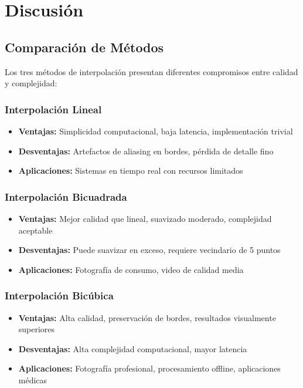 \section{Discusión}\label{sec:discusion}

\subsection{Comparación de Métodos}

Los tres métodos de interpolación presentan diferentes compromisos entre calidad y complejidad:

\subsubsection{Interpolación Lineal}
\begin{itemize}
    \item \textbf{Ventajas:} Simplicidad computacional, baja latencia, implementación trivial
    \item \textbf{Desventajas:} Artefactos de aliasing en bordes, pérdida de detalle fino
    \item \textbf{Aplicaciones:} Sistemas en tiempo real con recursos limitados
\end{itemize}

\subsubsection{Interpolación Bicuadrada}
\begin{itemize}
    \item \textbf{Ventajas:} Mejor calidad que lineal, suavizado moderado, complejidad aceptable
    \item \textbf{Desventajas:} Puede suavizar en exceso, requiere vecindario de 5 puntos
    \item \textbf{Aplicaciones:} Fotografía de consumo, video de calidad media
\end{itemize}

\subsubsection{Interpolación Bicúbica}
\begin{itemize}
    \item \textbf{Ventajas:} Alta calidad, preservación de bordes, resultados visualmente superiores
    \item \textbf{Desventajas:} Alta complejidad computacional, mayor latencia
    \item \textbf{Aplicaciones:} Fotografía profesional, procesamiento offline, aplicaciones médicas
\end{itemize}

